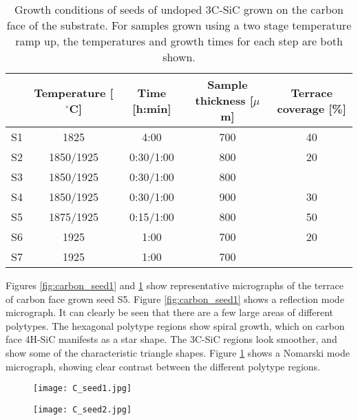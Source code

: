 \begin{table}[h]
\caption{Growth conditions of seeds of undoped 3C-SiC grown on the carbon face of the substrate. For samples grown using a two stage temperature ramp up, the temperatures and growth times for each step are both shown.}
\label{tab:seeds}
\begin{center}
\begin{tabular}{l c c c c}
  \hline                       
  \hline       
  \vspace{1mm}
   & \small{Temperature [$^\circ$C]} & \small{Time [h:min]} & \small{Sample thickness [$\mu$m]} & \small{Terrace coverage [\%]}\\
    \hline
  S1 & 1825 & 4:00 & 700 & 40\\
  S2 & 1850/1925 & 0:30/1:00 & 800 & 20\\
  S3 & 1850/1925 & 0:30/1:00 & 800 & \\
  S4 & 1850/1925 & 0:30/1:00 & 900 & 30\\
  S5 & 1875/1925 & 0:15/1:00 & 800 & 50\\
  S6 & 1925 & 1:00 & 700 & 20\\
  S7 & 1925 & 1:00 & 700 & \\
  \hline  
\end{tabular}
\end{center}
\end{table}


Figures \ref{fig:carbon_seed1} and \ref{fig:carbon_seed2} show representative micrographs of the terrace of carbon face grown seed S5. Figure \ref{fig:carbon_seed1} shows a reflection mode micrograph. It can clearly be seen that there are a few large areas of different polytypes. The hexagonal polytype regions show spiral growth, which on carbon face 4H-SiC manifests as a star shape. The 3C-SiC regions look smoother, and show some of the characteristic triangle shapes. Figure \ref{fig:carbon_seed2} shows a Nomarski mode micrograph, showing clear contrast between the different polytype regions. 

\begin{figure}[h]
\centering
\begin{minipage}{.5\textwidth}
  \centering
  \texttt{[image: C\_seed1.jpg]}
  \label{fig:carbon_seed1}
\end{minipage}%
\begin{minipage}{.5\textwidth}
  \centering
  \texttt{[image: C\_seed2.jpg]}
  \label{fig:carbon_seed2}
\end{minipage}
\end{figure}

